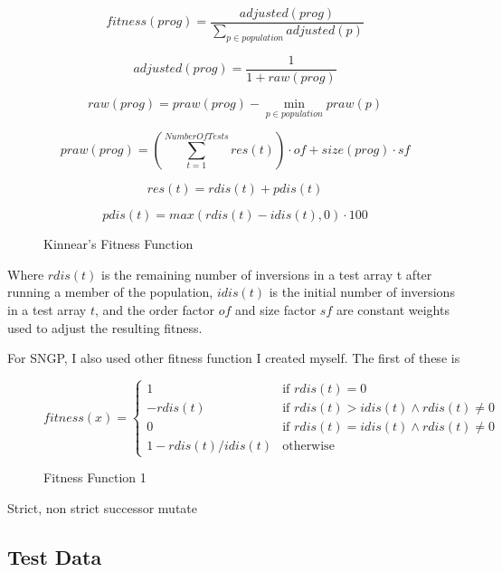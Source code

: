 \documentclass{article}
\begin{document}
        \begin{figure}[H]
            $$fitness(prog) = \frac{adjusted(prog)}{\sum_{p\in population}^{}adjusted(p)}$$
            
            $$adjusted(prog) = \frac{1}{1 + raw(prog)}$$
            
            $$raw(prog) = praw(prog) - \min_{p\in population} praw(p)$$
            
            $$praw(prog) = \left(\sum_{t = 1}^{Number Of Tests}res(t)\right) \cdot of + size(prog) \cdot sf$$
            
            $$res(t) = rdis(t) + pdis(t)$$
            
            $$pdis(t) = max(rdis(t) - idis(t), 0) \cdot 100$$
            
            \caption{Kinnear's Fitness Function}
            
            \label{kinnear_fitness}		
        
        \end{figure}
        Where $rdis(t)$ is the remaining number of inversions in a test array t after running a member of the population, $idis(t)$ is the initial number of inversions in a test array $t$, and the order factor $of$ and size factor $sf$ are constant weights used to adjust the resulting fitness.
        
        For SNGP, I also used other fitness function I created myself. The first of these is
        
        \begin{figure}[H]
        	$   fitness(x) =
        	\begin{cases} 
	        	1 & \mbox{if } rdis(t) = 0 \\
	        	-rdis(t) & \mbox{if } rdis(t) > idis(t) \land rdis(t) \neq 0 \\
	        	0 & \mbox{if }  rdis(t) = idis(t) \land rdis(t) \neq 0 \\
	        	1 - rdis(t)/idis(t) & \mbox{otherwise }
        	\end{cases}
        	$
        	
        	\caption{Fitness Function 1}
        	\label{ftns_func1}
        \end{figure}
    
    	Strict, non strict successor mutate

    \subsection{Test Data}
        
\end{document}
